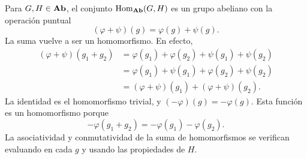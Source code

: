 Para $G,H\in\mathbf{Ab}$, el conjunto $\operatorname{Hom}_{\mathbf{Ab}}(G,H)$ es un grupo abeliano con la operación puntual
\[
(\varphi+\psi)(g)=\varphi(g)+\psi(g).
\]
La suma vuelve a ser un homomorfismo. En efecto,
\[
\begin{aligned}
(\varphi+\psi)(g_1+g_2)
&=\varphi(g_1)+\varphi(g_2)+\psi(g_1)+\psi(g_2)\\
&=\varphi(g_1)+\psi(g_1)+\varphi(g_2)+\psi(g_2)\\
&=(\varphi+\psi)(g_1)+(\varphi+\psi)(g_2).
\end{aligned}
\]
La identidad es el homomorfismo trivial, y $(-\varphi)(g)=-\varphi(g)$. Esta función es un homomorfismo porque
\[
-\varphi(g_1+g_2)=-\varphi(g_1)-\varphi(g_2).
\]
La asociatividad y conmutatividad de la suma de homomorfismos se verifican evaluando en cada $g$ y usando las propiedades de $H$.
